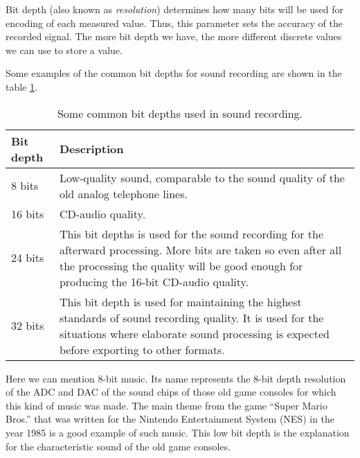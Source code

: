 \documentclass[../sparc.tex]{subfiles}
\begin{document}
Bit depth (also known as \emph{resolution}) determines how many bits will be
used for encoding of each measured value.  Thus, this parameter sets the
accuracy of the recorded signal.  The more bit depth we have, the more different
discrete values we can use to store a value.  \cite{audacityteam:bit-depth}

Some examples of the common bit depths for sound recording are shown in the
table \ref{table:adc-sound-bit-depth-1}.

\begin{table}[h]
  \centering
  \begin{tabular}{p{2cm}|p{9cm}}
    Bit depth & Description \\
    \hline \hline

    8 bits & Low-quality sound, comparable to the sound quality of the old
    analog telephone lines. \\

    \hline

    16 bits & CD-audio quality. \\

    \hline

    24 bits & This bit depths is used for the sound recording for the afterward
    processing.  More bits are taken so even after all the processing the
    quality will be good enough for producing the 16-bit CD-audio quality. \\

    \hline

    32 bits & This bit depth is used for maintaining the highest standards of
    sound recording quality.  It is used for the situations where elaborate
    sound processing is expected before exporting to other formats. \\

    \hline

  \end{tabular}
  \caption{Some common bit depths used in sound recording.}
  \label{table:adc-sound-bit-depth-1}
\end{table}

Here we can mention 8-bit music.  Its name represents the 8-bit depth resolution
of the ADC and DAC of the sound chips of those old game consoles for which this
kind of music was made.  The main theme from the game ``Super Mario Bros.'' that
was written for the Nintendo Entertainment System (NES) in the year 1985 is a
good example of such music.  This low bit depth is the explanation for the
characteristic sound of the old game consoles.
\end{document}
